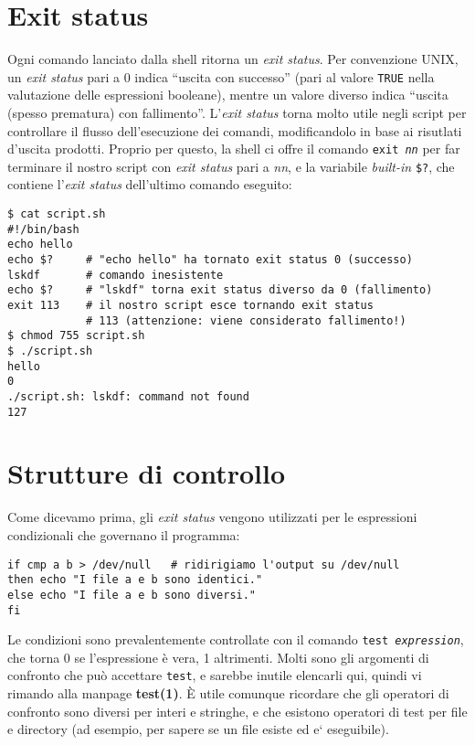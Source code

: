 \section{Exit status}
Ogni comando lanciato dalla shell ritorna un \emph{exit status}. Per
convenzione UNIX, un \emph{exit status} pari a 0 indica ``uscita con
successo'' (pari al valore \texttt{TRUE} nella valutazione delle espressioni
booleane), mentre un valore diverso indica ``uscita (spesso prematura) con
fallimento''. L'\emph{exit status} torna molto utile negli script per
controllare il flusso dell'esecuzione dei comandi, modificandolo in base ai
risutlati d'uscita prodotti. Proprio per questo, la shell ci offre il comando
\texttt{exit \textit{nn}} per far terminare il nostro script con \emph{exit
status} pari a \textit{nn}, e la variabile \emph{built-in} \texttt{\$?}, che
contiene l'\emph{exit status} dell'ultimo comando eseguito:
\begin{verbatim}
$ cat script.sh
#!/bin/bash
echo hello
echo $?     # "echo hello" ha tornato exit status 0 (successo)
lskdf       # comando inesistente
echo $?     # "lskdf" torna exit status diverso da 0 (fallimento)
exit 113    # il nostro script esce tornando exit status
            # 113 (attenzione: viene considerato fallimento!)
$ chmod 755 script.sh
$ ./script.sh
hello
0
./script.sh: lskdf: command not found
127
\end{verbatim}

\section{Strutture di controllo}
Come dicevamo prima, gli \emph{exit status} vengono utilizzati per le
espressioni condizionali che governano il programma:
\begin{verbatim}
if cmp a b > /dev/null   # ridirigiamo l'output su /dev/null
then echo "I file a e b sono identici."
else echo "I file a e b sono diversi."
fi
\end{verbatim}

Le condizioni sono prevalentemente controllate con il comando \texttt{test
\textit{expression}}, che torna 0 se l'espressione \`e vera, 1 altrimenti.
Molti sono gli argomenti di confronto che pu\`o accettare \texttt{test}, e
sarebbe inutile elencarli qui, quindi vi rimando alla manpage \textbf{test(1)}.
\`E utile comunque ricordare che gli operatori di confronto sono diversi per
interi e stringhe, e che esistono operatori di test per file e directory (ad
esempio, per sapere se un file esiste ed e` eseguibile).

